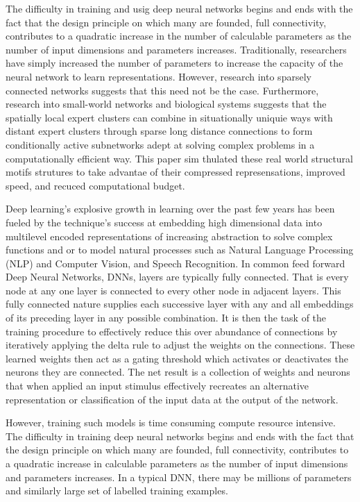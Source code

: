 \documentclass{llncs}
\begin{document}
The difficulty in training and usig deep neural networks begins and ends with the fact that the design principle on which many are founded, full connectivity, contributes to a quadratic increase in the number of calculable parameters as the number of input dimensions and parameters increases. Traditionally, researchers have simply increased the number of parameters to increase the capacity of the neural network to learn representations. However, research into sparsely connected networks suggests that this need not be the case.  Furthermore, research into small-world networks and biological systems suggests that the spatially local expert clusters can combine in situationally uniquie ways with distant expert clusters through sparse long distance connections to form conditionally active subnetworks adept at solving complex problems in a computationally efficient way.  This paper sim thulated these real world structural motifs strutures to take advantae of their compressed represensations, improved speed, and recuced computational budget.

Deep learning’s explosive growth in learning over the past few years has been fueled by the technique’s success at embedding high dimensional data into multilevel encoded representations of increasing abstraction to solve complex functions and or to model natural processes such as Natural Language Processing (NLP) and Computer Vision, and Speech Recognition. In common feed forward Deep Neural Networks, DNNs, layers are typically fully connected.  That is every node at any one layer is connected to every other node in adjacent layers.  This fully connected nature supplies each successive layer with any and all embeddings of its preceding layer in any possible combination. It is then the task of the training procedure to effectively reduce this over abundance of connections by iteratively applying the delta rule to adjust the weights on the connections.  These learned weights then act as a gating threshold which activates or deactivates the neurons they are connected.  The net result is a collection of weights and neurons that when applied an input stimulus effectively recreates an alternative representation or classification of the input data at the output of the network.

However, training such models is time consuming compute resource intensive.  The difficulty in training deep neural networks begins and ends with the fact that the design principle on which many are founded, full connectivity, contributes to a quadratic increase in calculable parameters as the number of input dimensions and parameters increases.  In a typical DNN, there may be millions of parameters and similarly large set of labelled training examples.
\end{document}
